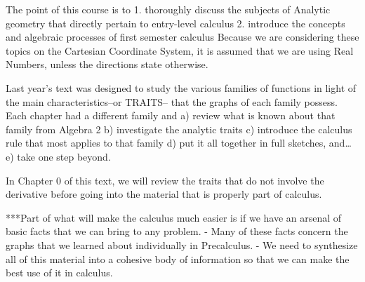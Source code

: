 The point of this course is to
    1. thoroughly discuss the subjects of Analytic geometry that directly pertain to entry-level calculus
    2. introduce the concepts and algebraic processes of first semester calculus
Because we are considering these topics on the Cartesian Coordinate System, it is assumed that we are using Real Numbers, unless the directions state otherwise.

Last year’s text was designed to study the various families of functions in light of the main characteristics--or TRAITS-- that the graphs of each family possess.
Each chapter had a different family and
    a) review what is known about that family from Algebra 2
    b) investigate the analytic traits
    c) introduce the calculus rule that most applies to that family
    d) put it all together in full sketches, and\dots
    e) take one step beyond.

In Chapter 0 of this text, we will review the traits that do not involve the derivative before going into the material that is properly part of calculus. 

***Part of what will make the calculus much easier is if we have an arsenal of basic facts that we can bring to any problem.
    - Many of these facts concern the graphs that we learned about individually in Precalculus.
    - We need to synthesize all of this material into a cohesive body of information so that we can make the best use of it in calculus.